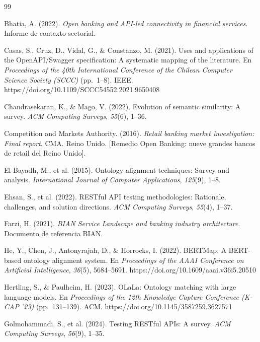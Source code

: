 
\begin{thebibliography}{99}

Bhatia, A. (2022).
\textit{Open banking and API-led connectivity in financial services}.
Informe de contexto sectorial.

Casas, S., Cruz, D., Vidal, G., \& Constanzo, M. (2021).
Uses and applications of the OpenAPI/Swagger specification: A systematic mapping of the literature.
En \textit{Proceedings of the 40th International Conference of the Chilean Computer Science Society (SCCC)} (pp.~1--8). IEEE.
https://doi.org/10.1109/SCCC54552.2021.9650408

Chandrasekaran, K., \& Mago, V. (2022).
Evolution of semantic similarity: A survey.
\textit{ACM Computing Surveys}, \textit{55}(6), 1--36.

Competition and Markets Authority. (2016).
\textit{Retail banking market investigation: Final report}.
CMA. Reino Unido.
[Remedio Open Banking: nueve grandes bancos de retail del Reino Unido].

El Bayadh, M., et al. (2015).
Ontology-alignment techniques: Survey and analysis.
\textit{International Journal of Computer Applications}, \textit{125}(9), 1--8.

Ehsan, S., et al. (2022).
RESTful API testing methodologies: Rationale, challenges, and solution directions.
\textit{ACM Computing Surveys}, \textit{55}(4), 1--37.

Farzi, H. (2021).
\textit{BIAN Service Landscape and banking industry architecture}.
Documento de referencia BIAN.

He, Y., Chen, J., Antonyrajah, D., \& Horrocks, I. (2022).
BERTMap: A BERT-based ontology alignment system.
En \textit{Proceedings of the AAAI Conference on Artificial Intelligence}, \textit{36}(5), 5684--5691.
https://doi.org/10.1609/aaai.v36i5.20510

Hertling, S., \& Paulheim, H. (2023).
OLaLa: Ontology matching with large language models.
En \textit{Proceedings of the 12th Knowledge Capture Conference (K-CAP '23)} (pp.~131--139).
ACM.
https://doi.org/10.1145/3587259.3627571

Golmohammadi, S., et al. (2024).
Testing RESTful APIs: A survey.
\textit{ACM Computing Surveys}, \textit{56}(9), 1--35.


\end{thebibliography}
